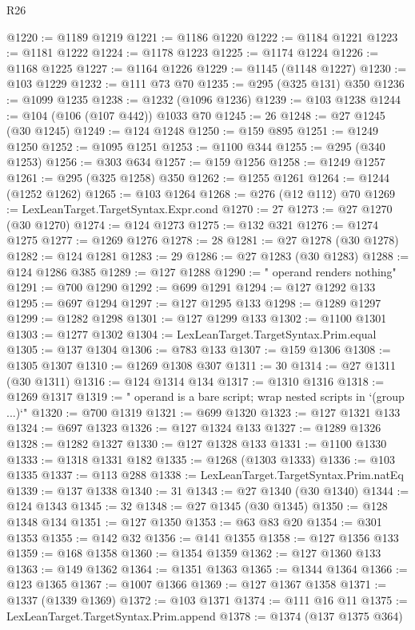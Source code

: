\begin{lexlean}{R26}
\begin{coremodule}
@1220 := @1189 @1219
@1221 := @1186 @1220
@1222 := @1184 @1221
@1223 := @1181 @1222
@1224 := @1178 @1223
@1225 := @1174 @1224
@1226 := @1168 @1225
@1227 := @1164 @1226
@1229 := @1145 (@1148 @1227)
@1230 := @103 @1229
@1232 := @111 @73 @70
@1235 := @295 (@325 @131) @350
@1236 := @1099 @1235
@1238 := @1232 (@1096 @1236)
@1239 := @103 @1238
@1244 := @104 (@106 (@107 @442)) @1033 @70
@1245 := 26
@1248 := @27 @1245 (@30 @1245)
@1249 := @124 @1248
@1250 := @159 @895
@1251 := @1249 @1250
@1252 := @1095 @1251
@1253 := @1100 @344
@1255 := @295 (@340 @1253)
@1256 := @303 @634
@1257 := @159 @1256
@1258 := @1249 @1257
@1261 := @295 (@325 @1258) @350
@1262 := @1255 @1261
@1264 := @1244 (@1252 @1262)
@1265 := @103 @1264
@1268 := @276 (@12 @112) @70
@1269 := LexLeanTarget.TargetSyntax.Expr.cond
@1270 := 27
@1273 := @27 @1270 (@30 @1270)
@1274 := @124 @1273
@1275 := @132 @321
@1276 := @1274 @1275
@1277 := @1269 @1276
@1278 := 28
@1281 := @27 @1278 (@30 @1278)
@1282 := @124 @1281
@1283 := 29
@1286 := @27 @1283 (@30 @1283)
@1288 := @124 @1286 @385
@1289 := @127 @1288
@1290 := " operand renders nothing"
@1291 := @700 @1290
@1292 := @699 @1291
@1294 := @127 @1292 @133
@1295 := @697 @1294
@1297 := @127 @1295 @133
@1298 := @1289 @1297
@1299 := @1282 @1298
@1301 := @127 @1299 @133
@1302 := @1100 @1301
@1303 := @1277 @1302
@1304 := LexLeanTarget.TargetSyntax.Prim.equal
@1305 := @137 @1304
@1306 := @783 @133
@1307 := @159 @1306
@1308 := @1305 @1307
@1310 := @1269 @1308 @307
@1311 := 30
@1314 := @27 @1311 (@30 @1311)
@1316 := @124 @1314 @134
@1317 := @1310 @1316
@1318 := @1269 @1317
@1319 := " operand is a bare script; wrap nested scripts in `(group ...)`"
@1320 := @700 @1319
@1321 := @699 @1320
@1323 := @127 @1321 @133
@1324 := @697 @1323
@1326 := @127 @1324 @133
@1327 := @1289 @1326
@1328 := @1282 @1327
@1330 := @127 @1328 @133
@1331 := @1100 @1330
@1333 := @1318 @1331 @182
@1335 := @1268 (@1303 @1333)
@1336 := @103 @1335
@1337 := @113 @288
@1338 := LexLeanTarget.TargetSyntax.Prim.natEq
@1339 := @137 @1338
@1340 := 31
@1343 := @27 @1340 (@30 @1340)
@1344 := @124 @1343
@1345 := 32
@1348 := @27 @1345 (@30 @1345)
@1350 := @128 @1348 @134
@1351 := @127 @1350
@1353 := @63 @83 @20
@1354 := @301 @1353
@1355 := @142 @32
@1356 := @141 @1355
@1358 := @127 @1356 @133
@1359 := @168 @1358
@1360 := @1354 @1359
@1362 := @127 @1360 @133
@1363 := @149 @1362
@1364 := @1351 @1363
@1365 := @1344 @1364
@1366 := @123 @1365
@1367 := @1007 @1366
@1369 := @127 @1367 @1358
@1371 := @1337 (@1339 @1369)
@1372 := @103 @1371
@1374 := @111 @16 @11
@1375 := LexLeanTarget.TargetSyntax.Prim.append
@1378 := @1374 (@137 @1375 @364)

\end{coremodule}
\end{lexlean}
